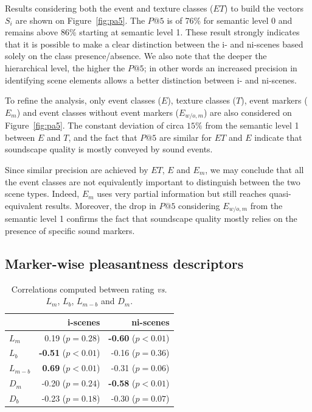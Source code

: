 \documentclass[twoside,twocolumn]{article}
\begin{document}
Results considering both the event and texture classes ($ET$)   to build the vectors  $S_i$ are shown on Figure~\ref{fig:pa5}. The $P@5$ is of 76\% for semantic level 0 and remains above 86\% starting at semantic level 1. These result strongly indicates that it is possible to make a clear distinction between the i- and ni-scenes based solely on the class presence/absence. We also note that the deeper the hierarchical level, the higher the $P@5$; in other words an increased precision in identifying scene elements allows a better distinction between i- and ni-scenes. 

To refine the analysis, only event classes ($E$), texture classes ($T$), event markers ($E_m$) and event classes without event markers ($E_{w/o,m}$) are also considered on Figure~\ref{fig:pa5}. The constant deviation of circa $15\%$ from the semantic level 1 between $E$ and $T$, and the fact that $P@5$ are similar for $ET$ and $E$ indicate that soundscape quality is mostly conveyed by sound events.

Since similar precision are achieved by $ET$, $E$ and $E_m$, we may conclude that all the event classes are not equivalently important to distinguish between the two scene types. Indeed, $E_m$ uses very partial information but still reaches quasi-equivalent results. Moreover, the drop in $P@5$ considering $E_{w/o,m}$ from the semantic level 1 confirms the fact that soundscape quality mostly relies on the presence of specific sound markers.


\subsection{Marker-wise pleasantness descriptors}
\label{sec:QuantifyingMarkers}

\begin{table}[t]
\centering
\begin{tabular}{l r r} 
                    &   i-scenes   & ni-scenes \\
\hline
$L_m$         & 0.19  ($p=0.28$)           & \textbf{-0.60} ($p<0.01$) \\
$L_b$         & \textbf{-0.51} ($p<0.01$)  & -0.16 ($p=0.36$) \\
$L_{m-b}$     & \textbf{0.69} ($p<0.01$)   & -0.31 ($p=0.06$) \\
$D_{m}$       & -0.20  ($p=0.24$)          & \textbf{-0.58} ($p<0.01$)  \\
$D_{b}$       & -0.23  ($p=0.18$)          & -0.30 ($p=0.07$)  \\
\hline
\end{tabular}
\vspace{0.5mm}
\caption{\label{tab:numMarkers} Correlations computed between rating \emph{vs.} $L_m$, $L_b$, $L_{m-b}$ and $D_m$.}
\end{table}
\end{document}
